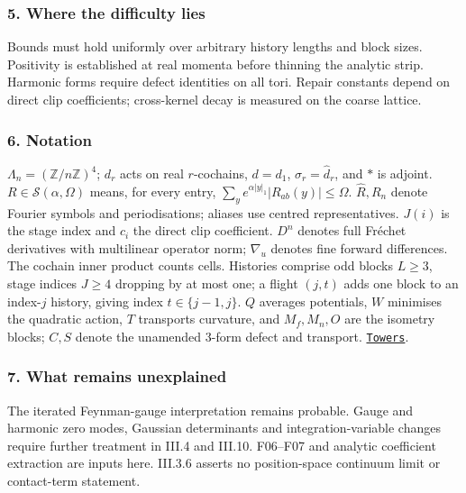 \documentclass[
  letterpaper,
  11pt]{article}
\begin{document}
\subsubsection{5. Where the difficulty
lies}\label{where-the-difficulty-lies-5}

Bounds must hold uniformly over arbitrary history lengths and block
sizes. Positivity is established at real momenta before thinning the
analytic strip. Harmonic forms require defect identities on all tori.
Repair constants depend on direct clip coefficients; cross-kernel decay
is measured on the coarse lattice.

\subsubsection{6. Notation}\label{notation-5}

\(\Lambda_n=(\mathbb Z/n\mathbb Z)^4\); \(d_r\) acts on real
\(r\)-cochains, \(d=d_1\), \(\sigma_r=\hat d_r\), and \(*\) is adjoint.
\(R\in\mathcal S(\alpha,\Omega)\) means, for every entry,
\(\sum_ye^{\alpha|y|_1}|R_{ab}(y)|\le\Omega\). \(\hat R,R_n\) denote
Fourier symbols and periodisations; aliases use centred representatives.
\(J(i)\) is the stage index and \(c_i\) the direct clip coefficient.
\(D^n\) denotes full Fréchet derivatives with multilinear operator norm;
\(\nabla_u\) denotes fine forward differences. The cochain inner product
counts cells. Histories comprise odd blocks \(L\ge3\), stage indices
\(J\ge4\) dropping by at most one; a flight \((j,t)\) adds one block to
an index-\(j\) history, giving index \(t\in\{j-1,j\}\). \(Q\) averages
potentials, \(W\) minimises the quadratic action, \(T\) transports
curvature, and \(M_f,M_n,O\) are the isometry blocks; \(C,S\) denote the
unamended 3-form defect and transport.
\href{https://github.com/yang-mills-group/OpenAI-YM-20261028/blob/3456e5e75cf8d4cd558955a5c7638fba2d68f464/YM/PREC/Stacks.lean\#L70-L75}{\texttt{Towers}}.

\subsubsection{7. What remains
unexplained}\label{what-remains-unexplained-5}

The iterated Feynman-gauge interpretation remains probable. Gauge and
harmonic zero modes, Gaussian determinants and integration-variable
changes require further treatment in III.4 and III.10. F06--F07 and
analytic coefficient extraction are inputs here. III.3.6 asserts no
position-space continuum limit or contact-term statement.
\end{document}
